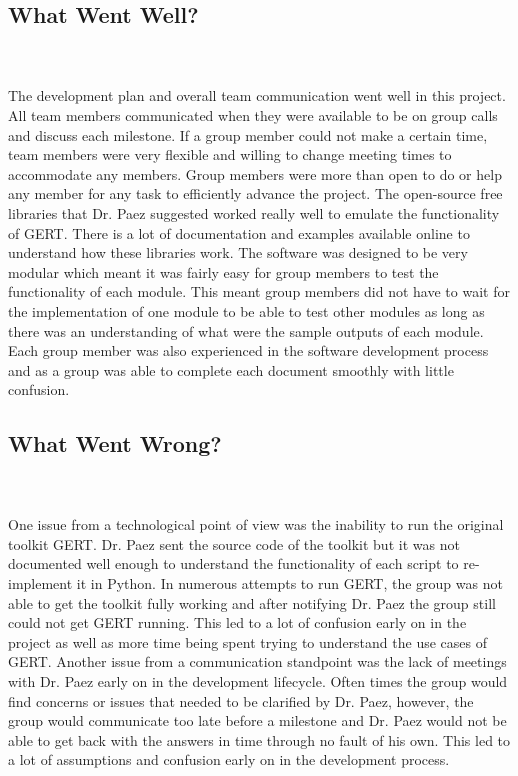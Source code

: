 \documentclass{article}
\begin{document}
\subsection{What Went Well?}

\\ \\
The development plan and overall team communication went well in this project. All team members communicated when they were available to be on group calls and discuss each milestone. If a group member could not make a certain time, team members were very flexible and willing to change meeting times to accommodate any members. Group members were more than open to do or help any member for any task to efficiently advance the project. The open-source free libraries that Dr. Paez suggested worked really well to emulate the functionality of GERT. There is a lot of documentation and examples available online to understand how these libraries work. The software was designed to be very modular which meant it was fairly easy for group members to test the functionality of each module. This meant group members did not have to wait for the implementation of one module to be able to test other modules as long as there was an understanding of what were the sample outputs of each module. Each group member was also experienced in the software development process and as a group was able to complete each document smoothly with little confusion.

\subsection{What Went Wrong?}

\\ \\
One issue from a technological point of view was the inability to run the original toolkit GERT. Dr. Paez sent the source code of the toolkit but it was not documented well enough to understand the functionality of each script to re-implement it in Python. In numerous attempts to run GERT, the group was not able to get the toolkit fully working and after notifying Dr. Paez the group still could not get GERT running. This led to a lot of confusion early on in the project as well as more time being spent trying to understand the use cases of GERT. Another issue from a communication standpoint was the lack of meetings with Dr. Paez early on in the development lifecycle. Often times the group would find concerns or issues that needed to be clarified by Dr. Paez, however, the group would communicate too late before a milestone and Dr. Paez would not be able to get back with the answers in time through no fault of his own. This led to a lot of assumptions and confusion early on in the development process. 
\end{document}

